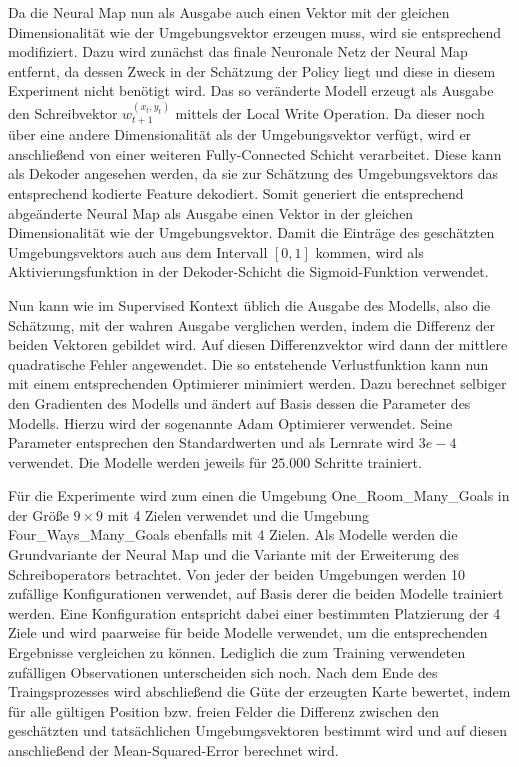 Da die Neural Map nun als Ausgabe auch einen Vektor mit der gleichen Dimensionalität wie der Umgebungsvektor erzeugen muss, wird sie entsprechend modifiziert. Dazu wird zunächst das finale Neuronale Netz der Neural Map entfernt, da dessen Zweck in der Schätzung der Policy liegt und diese in diesem Experiment nicht benötigt wird. Das so veränderte Modell erzeugt als Ausgabe den Schreibvektor $w_{t+1}^{(x_t,y_t)}$ mittels der Local Write Operation. Da dieser noch über eine andere Dimensionalität als der Umgebungsvektor verfügt, wird er anschließend von einer weiteren Fully-Connected Schicht verarbeitet. Diese kann als Dekoder angesehen werden, da sie zur Schätzung des Umgebungsvektors das entsprechend kodierte Feature dekodiert. Somit generiert die entsprechend abgeänderte Neural Map als Ausgabe einen Vektor in der gleichen Dimensionalität wie der Umgebungsvektor. Damit die Einträge des geschätzten Umgebungsvektors auch aus dem Intervall $[0, 1]$ kommen, wird als Aktivierungsfunktion in der Dekoder-Schicht die Sigmoid-Funktion verwendet.

Nun kann wie im Supervised Kontext üblich die Ausgabe des Modells, also die Schätzung, mit der wahren Ausgabe verglichen werden, indem die Differenz der beiden Vektoren gebildet wird. Auf diesen Differenzvektor wird dann der mittlere quadratische Fehler angewendet. Die so entstehende Verlustfunktion kann nun mit einem entsprechenden Optimierer minimiert werden. Dazu berechnet selbiger den Gradienten des Modells und ändert auf Basis dessen die Parameter des Modells. Hierzu wird der sogenannte Adam Optimierer verwendet. Seine Parameter entsprechen den Standardwerten und als Lernrate wird $3e-4$ verwendet. Die Modelle werden jeweils für $25.000$ Schritte trainiert.

Für die Experimente wird zum einen die Umgebung \glqq One\_Room\_Many\_Goals\grqq{} in der Größe $9 \times 9$ mit 4 Zielen verwendet und die Umgebung \glqq Four\_Ways\_Many\_Goals\grqq{} ebenfalls mit 4 Zielen. Als Modelle werden die Grundvariante der Neural Map und die Variante mit der Erweiterung des Schreiboperators betrachtet. Von jeder der beiden Umgebungen werden 10 zufällige Konfigurationen verwendet, auf Basis derer die beiden Modelle trainiert werden. Eine Konfiguration entspricht dabei einer bestimmten Platzierung der 4 Ziele und wird paarweise für beide Modelle verwendet, um die entsprechenden Ergebnisse vergleichen zu können. Lediglich die zum Training verwendeten zufälligen Observationen unterscheiden sich noch. Nach dem Ende des Traingsprozesses wird abschließend die Güte der erzeugten Karte bewertet, indem für alle gültigen Position bzw. freien Felder die Differenz zwischen den geschätzten und tatsächlichen Umgebungsvektoren bestimmt wird und auf diesen anschließend der Mean-Squared-Error berechnet wird.

